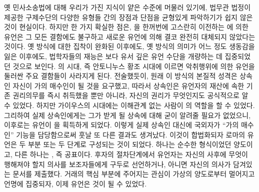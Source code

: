 옛 민사소송법에 대해 우리가 가진 지식이 얕은 수준에 머물러 있기에,
법무관 법정이 제공한 구제수단의 다양한 유형들 간의 장점과 단점을
균형있게 파악하기가 쉽지 않은 것이 현실이다.
하지만 한 가지 확실한 점은,
을 한꺼번에 고스란히 이전하는
%
에 의한 유언은
그 모든 결함에도 불구하고
새로운 유언에 의해 결코 완전히 대체되지 않았다는 것이다.
옛 방식에 대한 집착이 완화된 이후에도,
옛 방식의 의미가 어느 정도 생동감을 잃은 이후에도,
법학자들의 재능은 보다 유서 깊은 유언 수단을 개량하는 데
집중되었던 것으로 보인다.
의 시대, 즉 안토니누스 황조 시대에 이르면
%
악취행위에 의한 유언을 둘러싼 주요 결함들이 사라지게 된다.
전술했듯이, 원래 이 방식의 본질적 성격은
상속인 자신이 가의 매수인이 될 것을 요구했고,
따라서 상속인은
유언자의 재산에 속한 기존 권리의무를 즉시 취득했을 뿐만 아니라,
자신의 권리가 무엇인지도 공식적으로 알 수 있었다.
하지만 가이우스의 시대에는
이해관계 없는 사람이 의 역할을 할 수 있었다.
그리하여 실제 상속인에게는 그가 받게 될 상속에 대해 굳이 알려줄 필요가 없었으니,
이후로는 유언이 을 획득하게 되었다.
이렇게 실제 상속인 대신에 국외자가 ``가의 매수인'' 기능을 담당함으로써
훗날 또 다른 결과도 생겨났다.
이것이 합법화되자 로마의 유언은 두 부분 또는 두 단계로
구성되는 것이 되었다.
하나는 순수한 형식이었던 양도이고,
다른 하나는 , 즉 공표이다.
후자의 절차단계에서 유언자는
자신의 사후에 무엇이 행해져야 할지 의사를 보조자들에게 구두로 선언하거나,
아니면 자신의 의사가 담겨있는 문서를 제출했다.
거래의 핵심 부분에 주어지는 관심이
가상의 양도로부터 멀어지고
언명에 집중되자,
이제 유언은  것이 될 수 있었다.

